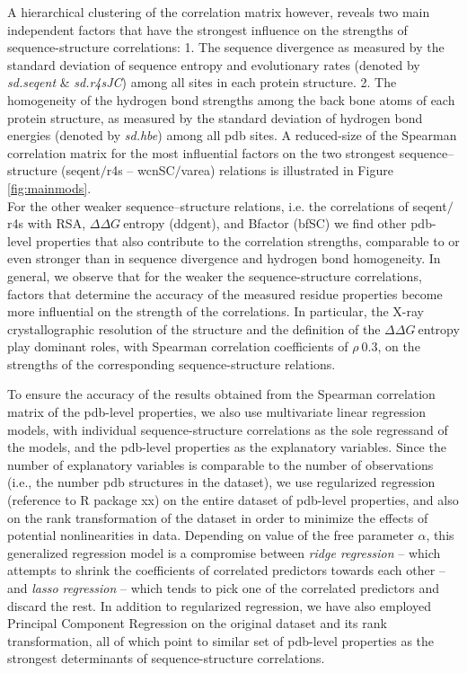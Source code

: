 \documentclass[11pt]{article}
\newcommand{\ddg}{$\Delta\Delta G~$}
\begin{document}
        A hierarchical clustering of the correlation matrix however, reveals two main independent factors that have the strongest influence on the strengths of sequence-structure correlations: 1. The sequence divergence as measured by the standard deviation of sequence entropy and evolutionary rates (denoted by {\it sd.seqent} \& {\it sd.r4sJC}) among all sites in each protein structure.   2. The homogeneity of the hydrogen bond strengths among the back bone atoms of each protein structure, as measured by the standard deviation of hydrogen bond energies (denoted by {\it sd.hbe}) among all pdb sites.   A reduced-size of the Spearman correlation matrix for the most influential factors on the two strongest sequence--structure (seqent$/$r4s -- wcnSC$/$varea) relations is illustrated in Figure \ref{fig:mainmods}.
        \\

        For the other weaker sequence--structure relations, i.e. the correlations of seqent$/$r4s with RSA, \ddg entropy (ddgent), and Bfactor (bfSC) we find other pdb-level properties that also contribute to the correlation strengths, comparable to or even stronger than in sequence divergence and hydrogen bond homogeneity. In general, we observe that for the weaker the sequence-structure correlations, factors that determine the accuracy of the measured residue properties become more influential on the strength of the correlations. In particular, the X-ray crystallographic resolution of the structure and the definition of the \ddg entropy play dominant roles, with Spearman correlation coefficients of $\rho~0.3$, on the strengths of the corresponding sequence-structure relations.


        To ensure the accuracy of the results obtained from the Spearman correlation matrix of the pdb-level properties, we also use multivariate linear regression models, with individual sequence-structure correlations as the sole regressand of the models, and the pdb-level properties as the explanatory variables.  Since the number of explanatory variables is comparable to the number of observations (i.e., the number pdb structures in the dataset), we use regularized regression (reference to R package xx) on the entire dataset of pdb-level properties, and also on the rank transformation of the dataset in order to minimize the effects of potential nonlinearities in data. Depending on value of the free parameter $\alpha$, this generalized regression model is a compromise between {\it ridge regression} -- which attempts to shrink the coefficients of correlated predictors towards each other -- and {\it lasso regression} -- which tends to pick one of the correlated predictors and discard the rest. In addition to regularized regression, we have also employed Principal Component Regression on the original dataset and its rank transformation, all of which point to similar set of pdb-level properties as the strongest determinants of sequence-structure correlations.
\end{document}
